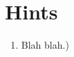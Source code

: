\documentclass[11pt,a5paper]{article}
\begin{document}
\section{Hints}
\begin{enumerate}
	\subsection*{Easy}
	\subsection*{Medium}
	\subsection*{Difficult}
	\subsection*{Extra}	
	\item{Blah blah.)}
\end{enumerate}
\end{document}
